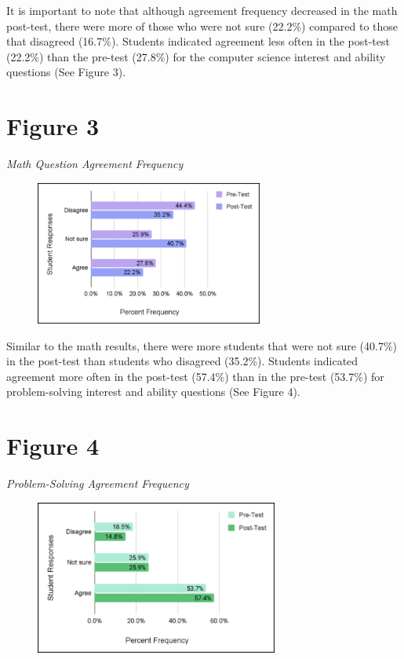 \documentclass[11.5pt]{sig-alternate}
\begin{document}
\begin{large}
It is important to note that although agreement frequency decreased in the math post-test, there were more of those who were not sure (22.2\%) compared to those that disagreed (16.7\%).
Students indicated agreement less often in the post-test (22.2\%) than the pre-test (27.8\%) for the computer science interest and ability questions (See Figure 3).

\section*{Figure 3}
\textit{Math Question Agreement Frequency}

\begin{figure}[h!]
\centering
\includegraphics[width=7.5cm]{figure 3.png}
\end{figure}

Similar to the math results, there were more students that were not sure (40.7\%) in the post-test than students who disagreed (35.2\%). Students indicated agreement more often in the post-test (57.4\%) than in the pre-test (53.7\%) for problem-solving interest and ability questions (See Figure 4).

\section*{Figure 4}
\textit{Problem-Solving Agreement Frequency}
\\
\begin{figure}[h!]
\centering
\includegraphics[width=8cm]{figure 4.png}


\end{figure}
\end{large}
\end{document}
